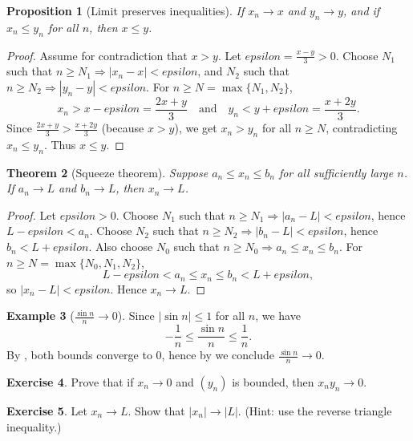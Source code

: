 \documentclass[12pt]{article}
\numberwithin{equation}{section}
\def\abs#1{|#1|}
\def\eps{epsilon}
\DeclarePairedDelimiter{\abs}{\lvert}{\rvert}
\newcommand{\eps}{\varepsilon}               %
\theoremstyle{plain}
\newtheorem{theorem}{Theorem}[section]
\newtheorem{proposition}[theorem]{Proposition}
\theoremstyle{definition}
\newtheorem{example}[theorem]{Example}
\newtheorem{exercise}[theorem]{Exercise}
\theoremstyle{remark}
\begin{document}
\begin{proposition}[Limit preserves inequalities]\label{prop:limit-order}
If $x_n\to x$ and $y_n\to y$, and if $x_n\le y_n$ for all $n$, then $x\le y$.
\end{proposition}

\begin{proof}
Assume for contradiction that $x>y$. Let $\eps=\frac{x-y}{3}>0$.
Choose $N_1$ such that $n\ge N_1\Rightarrow \abs{x_n-x}<\eps$, and $N_2$ such that $n\ge N_2\Rightarrow \abs{y_n-y}<\eps$.
For $n\ge N=\max\{N_1,N_2\}$,
\[
x_n > x-\eps = \frac{2x+y}{3}
\quad\text{and}\quad
y_n < y+\eps = \frac{x+2y}{3}.
\]
Since $\frac{2x+y}{3}>\frac{x+2y}{3}$ (because $x>y$), we get $x_n>y_n$ for all $n\ge N$, contradicting $x_n\le y_n$.
Thus $x\le y$.
\end{proof}

\begin{theorem}[Squeeze theorem]\label{thm:squeeze}
Suppose $a_n\le x_n\le b_n$ for all sufficiently large $n$.
If $a_n\to L$ and $b_n\to L$, then $x_n\to L$.
\end{theorem}

\begin{proof}
Let $\eps>0$. Choose $N_1$ such that $n\ge N_1\Rightarrow \abs{a_n-L}<\eps$, hence $L-\eps<a_n$.
Choose $N_2$ such that $n\ge N_2\Rightarrow \abs{b_n-L}<\eps$, hence $b_n<L+\eps$.
Also choose $N_0$ such that $n\ge N_0\Rightarrow a_n\le x_n\le b_n$.
For $n\ge N=\max\{N_0,N_1,N_2\}$,
\[
L-\eps<a_n\le x_n\le b_n<L+\eps,
\]
so $\abs{x_n-L}<\eps$. Hence $x_n\to L$.
\end{proof}

\begin{example}[$\frac{\sin n}{n}\to 0$]\label{ex:sin-n-over-n}
Since $\abs{\sin n}\le 1$ for all $n$, we have
\[
-\frac{1}{n}\le \frac{\sin n}{n}\le \frac{1}{n}.
\]
By , both bounds converge to $0$, hence by  we conclude $\frac{\sin n}{n}\to 0$.
\end{example}

\begin{exercise}
Prove that if $x_n\to 0$ and $(y_n)$ is bounded, then $x_ny_n\to 0$.
\end{exercise}

\begin{exercise}
Let $x_n\to L$. Show that $\abs{x_n}\to \abs{L}$.
(Hint: use the reverse triangle inequality.)
\end{exercise}

\newpage
\end{document}
